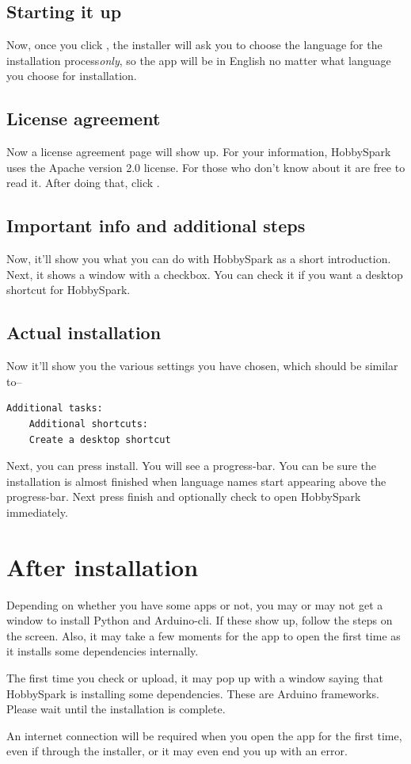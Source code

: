 \subsection{Starting it up}
Now, once you click , the installer will ask you to choose the language for the installation process\emph{only}, so the app will be in English no matter what language you choose for installation.

\subsection{License agreement}
Now a license agreement page will show up. For your information, HobbySpark uses the Apache version 2.0 license. For those who don't know about it are free to read it. After doing that, click .

\subsection{Important info and additional steps}
Now, it'll show you what you can do with HobbySpark as a short introduction. Next, it shows a window with a checkbox. You can check it if you want a desktop shortcut for HobbySpark.

\subsection{Actual installation}
Now it'll show you the various settings you have chosen, which should be similar to--
\begin{lstlisting}[style=tracebacks]
	Additional tasks:
	Additional shortcuts:
	Create a desktop shortcut
\end{lstlisting}


Next, you can press install. You will see a progress-bar. You can be sure the installation is almost finished when language names start appearing above the progress-bar. Next press finish and optionally check  to open HobbySpark immediately. 
\section{After installation}
Depending on whether you have some apps or not, you may or may not get a window to install Python and Arduino-cli. If these show up, follow the steps on the screen. Also, it may take a few moments for the app to open the first time as it installs some dependencies internally.

The first time you check or upload, it may pop up with a window saying that HobbySpark is installing some dependencies. These are Arduino frameworks. Please wait until the installation is complete. 

An internet connection will be required when you open the app for the first time, even if through the installer, or it may even end you up with an error.